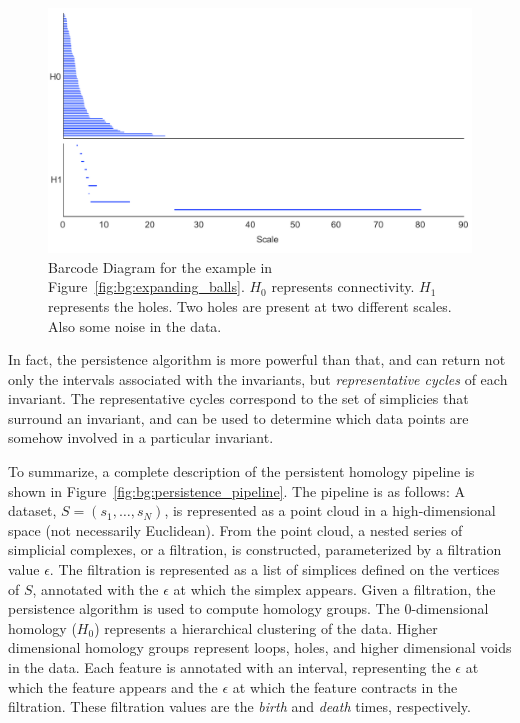 \begin{figure}
\centering
\includegraphics[width=.75\textwidth]{fig/background/expanding_balls_barcode.pdf}
\caption[Barcode Diagram for the Two Circles Example]{Barcode Diagram for the example in Figure~\ref{fig:bg:expanding_balls}. $H_0$ represents connectivity. $H_1$ represents the holes. Two holes are present at two different scales. Also some noise in the data.}
\label{fig:bg:expanding_balls_barcode}
\end{figure}

In fact, the persistence algorithm is more powerful than that, and can return not only the intervals associated with the invariants, but \emph{representative cycles} of each invariant.
The representative cycles correspond to the set of simplicies that surround an invariant, and can be used to determine which data points are somehow involved in a particular invariant.

To summarize, a complete description of the persistent homology pipeline is shown in Figure~\ref{fig:bg:persistence_pipeline}.
The pipeline is as follows:
A dataset, $S=(s_{1},\ldots,s_{N})$, is represented as a point cloud in a high-dimensional space (not necessarily Euclidean).
From the point cloud, a nested series of simplicial complexes, or a filtration, is constructed, parameterized by a filtration value $\epsilon$.
The filtration is represented as a list of simplices defined on the vertices of $S$, annotated with the $\epsilon$ at which the simplex appears.
Given a filtration, the persistence algorithm is used to compute homology groups.
The $0$-dimensional homology ($H_0$) represents a hierarchical clustering of the data.
Higher dimensional homology groups represent loops, holes, and higher dimensional voids in the data.
Each feature is annotated with an interval, representing the $\epsilon$ at which the feature appears and the $\epsilon$ at which the feature contracts in the filtration.
These filtration values are the \emph{birth} and \emph{death} times, respectively.

